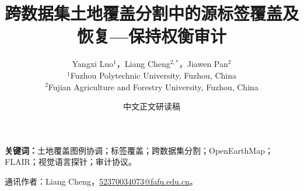 \documentclass[UTF8,fontset=windows,12pt,a4paper]{ctexart}
\title{跨数据集土地覆盖分割中的源标签覆盖及恢复—保持权衡审计}
\author{\normalsize Yangxi Luo$^{1}$，Liang Cheng$^{2,*}$，Jiawen Pan$^{2}$\\[4pt]
\small $^{1}$Fuzhou Polytechnic University, Fuzhou, China\\
\small $^{2}$Fujian Agriculture and Forestry University, Fuzhou, China}
\date{中文正文研读稿}
\begin{document}
\maketitle
\begin{abstract}

\end{abstract}
\noindent\textbf{关键词：}土地覆盖图例协调；标签覆盖；跨数据集分割；OpenEarthMap；FLAIR；视觉语言探针；审计协议。

\noindent 通讯作者：Liang Cheng，\href{mailto:52370034073@fafu.edu.cn}{52370034073@fafu.edu.cn}。










\clearpage
\appendix
\renewcommand{\thetable}{A.\arabic{table}}
\setcounter{table}{0}

\end{document}
